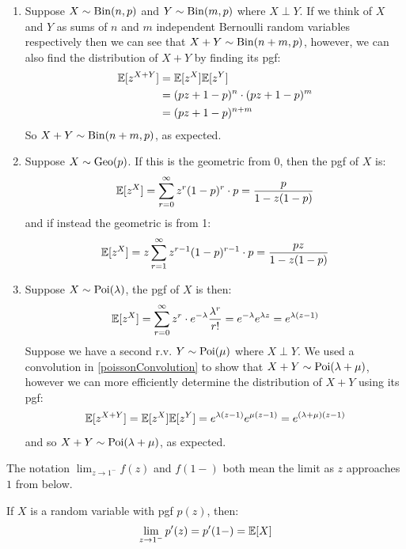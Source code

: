 \documentclass[../main.tex]{subfiles}
\begin{document}
\begin{example}
  \begin{enumerate}
    \item Suppose $X \sim \operatorname{Bin}(n, p)$ and $Y \sim \operatorname{Bin}(m, p)$ where $X \perp Y$.
      If we think of $X$ and $Y$ as sums of $n$ and $m$ independent Bernoulli random variables respectively then we can see that $X + Y \sim \operatorname{Bin}(n + m, p)$, however, we can also find the distribution of $X + Y$ by finding its pgf:
      \begin{align*}
        \mathbb{E}[z^{X+Y}] &= \mathbb{E}[z^{X}]\mathbb{E}[z^{Y}] \\
                    &= (pz + 1 - p)^{n} \cdot (pz + 1 - p)^{m} \\
                    &= (pz + 1 - p)^{n + m}
      \end{align*}
      So $X + Y \sim \operatorname{Bin}(n + m, p)$, as expected.
    \item Suppose $X \sim \operatorname{Geo}(p)$.
      If this is the geometric from 0, then the pgf of $X$ is:
      \[
        \mathbb{E}[z^{X}] = \sum_{r = 0}^{\infty} z^{r}(1 - p)^{r} \cdot p = \frac{p}{1 - z(1 - p)}
      \]
      and if instead the geometric is from 1:
      \[
        \mathbb{E}[z^{X}] = z\sum_{r = 1}^{\infty} z^{r - 1}(1 - p)^{r - 1} \cdot p = \frac{pz}{1 - z(1 - p)}
      \]
    \item Suppose $X \sim \operatorname{Poi}(\lambda)$, the pgf of $X$ is then:
      \[
        \mathbb{E}[z^{X}] = \sum_{r = 0}^{\infty} z^{r} \cdot e^{-\lambda} \frac{\lambda^{r}}{r!} = e^{-\lambda} e^{\lambda z} = e^{\lambda(z - 1)}
      \]
      Suppose we have a second r.v. $Y \sim \operatorname{Poi}(\mu)$ where $X \perp Y$.
      We used a convolution in \cref{poissonConvolution} to show that $X + Y \sim \operatorname{Poi}(\lambda + \mu)$, however we can more efficiently determine the distribution of $X + Y$ using its pgf:
      \[
        \mathbb{E}[z^{X + Y}] = \mathbb{E}[z^{X}]\mathbb{E}[z^{Y}] = e^{\lambda(z - 1)}e^{\mu(z  - 1)} = e^{(\lambda + \mu)(z - 1)}
      \]
      and so $X + Y \sim \operatorname{Poi}(\lambda + \mu)$, as expected.
  \end{enumerate}
\end{example}
\begin{remark}[Notation]
  The notation $\lim_{z \to 1^{-}} f(z)$ and $f(1-)$ both mean the limit as $z$ approaches $1$ from below.
\end{remark}
\begin{theorem}
  If $X$ is a random variable with pgf $p(z)$, then:
  \label{pgfDerivative}
  \[
    \lim_{z \to 1^-} p'(z) = p'(1-) =\mathbb{E}[X]
  \]
\end{theorem}
\end{document}

